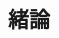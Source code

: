 \documentclass[12pt,a4paper]{report}
\begin{document}
\begin{CJK*}{UTF8}{bkai}


    \newpage


    \chapter{緒論}



\end{CJK*}
\end{document}
